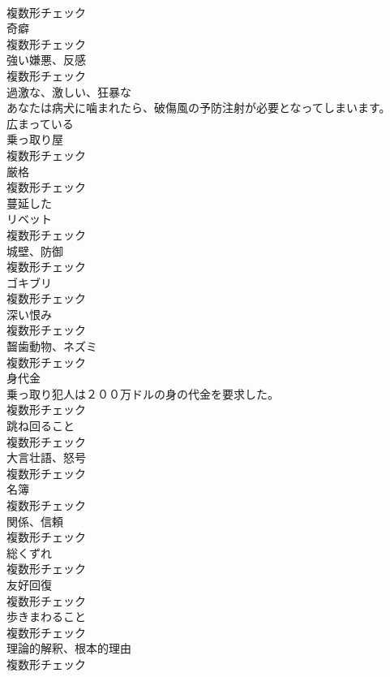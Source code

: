\documentclass[8pt]{extreport}
\begin{document}
\begin{CJK}{UTF8}{min}
\\	複数形チェック
\\	[名詞]	奇癖	
\\	複数形チェック
\\	[名詞]	強い嫌悪、反感	
\\	複数形チェック
\\	[形容詞]	過激な、激しい、狂暴な	
\\	あなたは病犬に噛まれたら、破傷風の予防注射が必要となってしまいます。	
\\	[形容詞]	広まっている	
\\	[名詞]	乗っ取り屋	
\\	複数形チェック
\\	[名詞]	厳格	
\\	複数形チェック
\\	[形容詞]	蔓延した	
\\	[名詞]	リベット	
\\	複数形チェック
\\	[名詞]	城壁、防御	
\\	複数形チェック
\\	[名詞]	ゴキブリ	
\\	複数形チェック
\\	[名詞]	深い恨み	
\\	複数形チェック
\\	[名詞]	齧⻭動物、ネズミ	
\\	複数形チェック
\\	[名詞]	身代金	
\\	乗っ取り犯人は２００万ドルの身の代金を要求した。	
\\	複数形チェック
\\	[名詞]	跳ね回ること	
\\	複数形チェック
\\	[名詞]	大言壮語、怒号	
\\	複数形チェック
\\	[名詞]	名簿	
\\	複数形チェック
\\	[名詞]	関係、信頼	
\\	複数形チェック
\\	[名詞]	総くずれ	
\\	複数形チェック
\\	[名詞]	友好回復	
\\	複数形チェック
\\	[名詞]	歩きまわること	
\\	複数形チェック
\\	[名詞]	理論的解釈、根本的理由	
\\	複数形チェック

\end{CJK}
\end{document}
